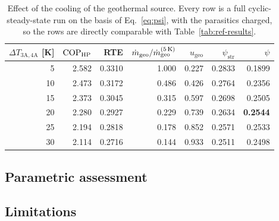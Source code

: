 \begin{table}[htbp]
\centering
\caption{Effect of the cooling of the geothermal source. Every row is a
full cyclic-steady-state run on the basis of Eq.~\eqref{eq:psi}, with the
parasitics charged, so the rows are directly comparable with
Table~\ref{tab:ref-results}.}
\label{tab:dt3a4a}
\small
\begin{tabular}{@{}r r r r r r r@{}}
\toprule
$\Delta T_\mathrm{3A,4A}$ [K] & $\mathrm{COP}_{\mathrm{HP}}$ & RTE & $\dot m_\mathrm{geo}/\dot m_\mathrm{geo}^{(5\,\mathrm{K})}$ &
$u_\mathrm{geo}$ & $\psi_\mathrm{str}$ & $\psi$ \\
\midrule
5  & 2.582 & 0.3310 & 1.000 & 0.227 & 0.2833 & 0.1899 \\
10 & 2.473 & 0.3172 & 0.486 & 0.426 & 0.2764 & 0.2356 \\
15 & 2.373 & 0.3045 & 0.315 & 0.597 & 0.2698 & 0.2505 \\
20 & 2.280 & 0.2927 & 0.229 & 0.739 & 0.2634 & \textbf{0.2544} \\
25 & 2.194 & 0.2818 & 0.178 & 0.852 & 0.2571 & 0.2533 \\
30 & 2.114 & 0.2716 & 0.144 & 0.933 & 0.2511 & 0.2498 \\
\bottomrule
\end{tabular}
\end{table}

\subsection{Parametric assessment}
\label{sec:res-param}


\subsection{Limitations}
\label{sec:limitations}

